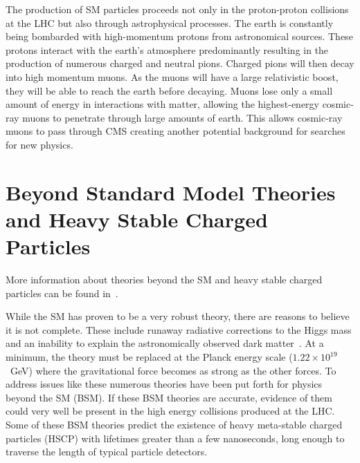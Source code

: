 The production of SM particles proceeds not only in the proton-proton collisions at the LHC but also through astrophysical processes.
The earth is constantly being bombarded with high-momentum protons from astronomical sources. These protons interact with the earth's atmosphere
predominantly resulting in the production of numerous charged and neutral pions. Charged pions will then decay into high momentum muons.
As the muons will have a large relativistic boost, they will be able to reach the earth before decaying.
Muons lose only a small amount of energy in interactions with matter,
allowing the highest-energy cosmic-ray muons to penetrate through large amounts of earth.
This allows cosmic-ray muons to pass through CMS creating another potential background for searches for new physics.

\section{Beyond Standard Model Theories and Heavy Stable Charged Particles \label{sec:BSM}}
More information about theories beyond the SM and heavy stable charged particles can be found in~\cite{1998pesu.conf....1M, Tata:1997uf, Fairbairn:2006gg}.

While the SM has proven to be a very robust theory, there are reasons to believe it is not complete. These include runaway
radiative corrections to the Higgs mass and an inability to explain the astronomically observed dark matter~\cite{1983SciAm.248...96R}.
At a minimum, the theory must be replaced at the Planck energy scale ($1.22 \times 10^{19}$~GeV)
where the gravitational force becomes as strong as the other forces. To address issues like these numerous
theories have been put forth for physics beyond the SM (BSM). 
If these BSM theories are accurate, evidence of them could very well be present in the high energy collisions produced at the LHC.
Some of these BSM theories predict the existence of heavy meta-stable
charged particles (HSCP) with lifetimes greater than a few nanoseconds, long enough to traverse the length of typical particle detectors. 

